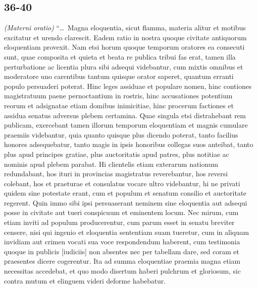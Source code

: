 \subsection*{36-40}

\textit{(Materni oratio)} ``\dots\ Magna eloquentia, sicut flamma, materia alitur et motibus excitatur et urendo clarescit. Eadem ratio in nostra quoque civitate antiquorum eloquentiam provexit. Nam etsi horum quoque temporum oratores ea consecuti sunt, quae composita et quieta et beata re publica tribui fas erat, tamen illa perturbatione ac licentia plura sibi adsequi videbantur, cum mixtis omnibus et moderatore uno carentibus tantum quisque orator saperet, quantum erranti populo persuaderi poterat. Hinc leges assiduae et populare nomen, hinc contiones magistratuum paene pernoctantium in rostris, hinc accusationes potentium reorum et adsignatae etiam domibus inimicitiae, hinc procerum factiones et assidua senatus adversus plebem certamina. Quae singula etsi distrahebant rem publicam, exercebant tamen illorum temporum eloquentiam et magnis cumulare praemiis videbantur, quia quanto quisque plus dicendo poterat, tanto facilius honores adsequebatur, tanto magis in ipsis honoribus collegas suos anteibat, tanto plus apud principes gratiae, plus auctoritatis apud patres, plus notitiae ac nominis apud plebem parabat. Hi clientelis etiam exterarum nationum redundabant, hos ituri in provincias magistratus reverebantur, hos reversi colebant, hos et praeturae et consulatus vocare ultro videbantur, hi ne privati quidem sine potestate erant, cum et populum et senatum consilio et auctoritate regerent. Quin immo sibi ipsi persuaserant neminem sine eloquentia aut adsequi posse in civitate aut tueri conspicuum et eminentem locum. Nec mirum, cum etiam inviti ad populum producerentur, cum parum esset in senatu breviter censere, nisi qui ingenio et eloquentia sententiam suam tueretur, cum in aliquam invidiam aut crimen vocati sua voce respondendum haberent, cum testimonia quoque in publicis [iudiciis] non absentes nec per tabellam dare, sed coram et praesentes dicere cogerentur. Ita ad summa eloquentiae praemia magna etiam necessitas accedebat, et quo modo disertum haberi pulchrum et gloriosum, sic contra mutum et elinguem videri deforme habebatur.

